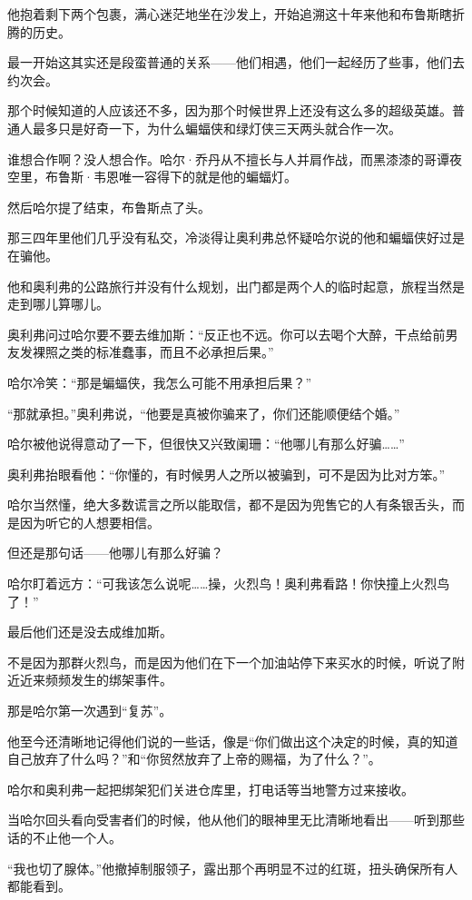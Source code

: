 \documentclass[../main]{subfiles}
\begin{document}
他抱着剩下两个包裹，满心迷茫地坐在沙发上，开始追溯这十年来他和布鲁斯瞎折腾的历史。

最一开始这其实还是段蛮普通的关系——他们相遇，他们一起经历了些事，他们去约次会。

那个时候知道的人应该还不多，因为那个时候世界上还没有这么多的超级英雄。普通人最多只是好奇一下，为什么蝙蝠侠和绿灯侠三天两头就合作一次。

谁想合作啊？没人想合作。哈尔·乔丹从不擅长与人并肩作战，而黑漆漆的哥谭夜空里，布鲁斯·韦恩唯一容得下的就是他的蝙蝠灯。

然后哈尔提了结束，布鲁斯点了头。

那三四年里他们几乎没有私交，冷淡得让奥利弗总怀疑哈尔说的他和蝙蝠侠好过是在骗他。

他和奥利弗的公路旅行并没有什么规划，出门都是两个人的临时起意，旅程当然是走到哪儿算哪儿。

奥利弗问过哈尔要不要去维加斯：“反正也不远。你可以去喝个大醉，干点给前男友发裸照之类的标准蠢事，而且不必承担后果。”

哈尔冷笑：“那是蝙蝠侠，我怎么可能不用承担后果？”

“那就承担。”奥利弗说，“他要是真被你骗来了，你们还能顺便结个婚。”

哈尔被他说得意动了一下，但很快又兴致阑珊：“他哪儿有那么好骗\ldots\ldots”

奥利弗抬眼看他：“你懂的，有时候男人之所以被骗到，可不是因为比对方笨。”

哈尔当然懂，绝大多数谎言之所以能取信，都不是因为兜售它的人有条银舌头，而是因为听它的人想要相信。

但还是那句话——他哪儿有那么好骗？

哈尔盯着远方：“可我该怎么说呢……操，火烈鸟！奥利弗看路！你快撞上火烈鸟了！”

最后他们还是没去成维加斯。

不是因为那群火烈鸟，而是因为他们在下一个加油站停下来买水的时候，听说了附近近来频频发生的绑架事件。

那是哈尔第一次遇到“复苏”。

他至今还清晰地记得他们说的一些话，像是“你们做出这个决定的时候，真的知道自己放弃了什么吗？”和“你贸然放弃了上帝的赐福，为了什么？”。

哈尔和奥利弗一起把绑架犯们关进仓库里，打电话等当地警方过来接收。

当哈尔回头看向受害者们的时候，他从他们的眼神里无比清晰地看出——听到那些话的不止他一个人。

“我也切了腺体。”他撤掉制服领子，露出那个再明显不过的红斑，扭头确保所有人都能看到。
\end{document}

